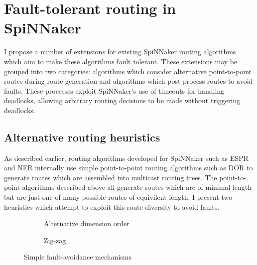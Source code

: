 	\section{Fault-tolerant routing in SpiNNaker}
		
		
		I propose a number of extensions for existing SpiNNaker routing algorithms
		which aim to make these algorithms fault tolerant. These extensions may be
		grouped into two categories: algorithms which consider alternative
		point-to-point routes during route generation and algorithms which
		post-process routes to avoid faults. These processes exploit SpiNNaker's
		use of timeouts for handling deadlocks, allowing arbitrary routing
		decisions to be made without triggering deadlocks.
		
		\subsection{Alternative routing heuristics}
			
			As described earlier, routing algorithms developed for SpiNNaker such as
			ESPR and NER internally use simple point-to-point routing algorithms such
			as DOR to generate routes which are assembled into multicast routing
			trees. The point-to-point algorithms described above all generate routes
			which are of minimal length but are just one of many possible routes of
			equivilent length. I present two heuristics which attempt to exploit this
			route diversity to avoid faults.
			
			\begin{figure}
				\center
				\begin{subfigure}{0.45\linewidth}
					\center
					
					\caption{Alternative dimension order}
					\label{fig:simple-fault-avoidance-order}
				\end{subfigure}
				\begin{subfigure}{0.45\linewidth}
					\center
					
					\caption{Zig-zag}
					\label{fig:simple-fault-avoidance-zigzag}
				\end{subfigure}
				
				\caption{Simple fault-avoidance mechanisms}
				\label{fig:simple-fault-avoidance}
			\end{figure}
			

